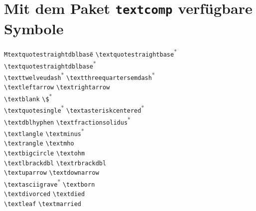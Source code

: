 
\appendix

\enlargethispage*{2.5\baselineskip}

\section{Mit dem Paket \texttt{textcomp} verfügbare Symbole}
\label{textsymbols}
{\small
\begin{tabbing}
\quad\quad\=\texttt{Mtextquotestraightdblbase}\hspace{1cm}\=\quad\quad\=\kill
\textquotestraightbase \> \verb+\textquotestraightbase+\textsuperscript{*}  \> \textquotestraightdblbase \> \verb+\textquotestraightdblbase+\textsuperscript{*} \\
\texttwelveudash \> \verb+\texttwelveudash+\textsuperscript{*}  \> \textthreequartersemdash \> \verb+\textthreequartersemdash+\textsuperscript{*} \\
\textleftarrow \> \verb+\textleftarrow+ \> \textrightarrow \> \verb+\textrightarrow+\\
\textblank \> \verb+\textblank+ \> \textdollar \> \verb+\$+\textsuperscript{*} \\
\textquotesingle \> \verb+\textquotesingle+\textsuperscript{*}  \> \textasteriskcentered \> \verb+\textasteriskcentered+\textsuperscript{*} \\
\textdblhyphen \> \verb+\textdblhyphen+ \> \textfractionsolidus \> \verb+\textfractionsolidus+\textsuperscript{*} \\
\textlangle \> \verb+\textlangle+ \> \textminus \> \verb+\textminus+\textsuperscript{*} \\
\textrangle \> \verb+\textrangle+ \> \textmho \> \verb+\textmho+\\
\textbigcircle \> \verb+\textbigcircle+ \> \textohm \> \verb+\textohm+\\
\textlbrackdbl \> \verb+\textlbrackdbl+ \> \textrbrackdbl \> \verb+\textrbrackdbl+\\
\textuparrow \> \verb+\textuparrow+ \> \textdownarrow \> \verb+\textdownarrow+\\
\textasciigrave \> \verb+\textasciigrave+\textsuperscript{*}  \> \textborn \> \verb+\textborn+\\
\textdivorced \> \verb+\textdivorced+ \> \textdied \> \verb+\textdied+\\
\textleaf \> \verb+\textleaf+ \> \textmarried \> \verb+\textmarried+\\

\end{tabbing}}
